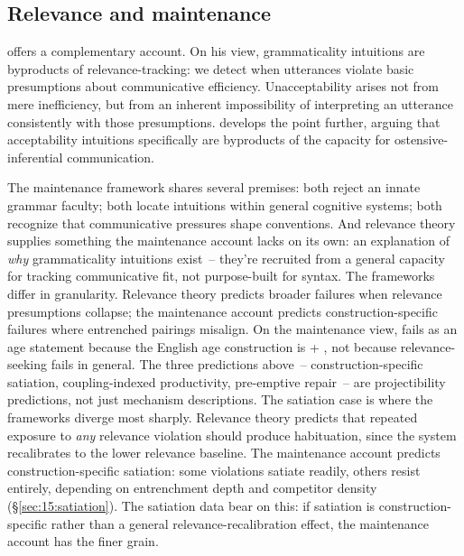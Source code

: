 \subsection{Relevance and maintenance}
\label{sec:15:relevance}

\textcite{scottphillips2024communication} offers a complementary account. On his view, grammaticality intuitions are byproducts of relevance-tracking: we detect when utterances violate basic presumptions about communicative efficiency. Unacceptability arises not from mere inefficiency, but from an inherent impossibility of interpreting an utterance consistently with those presumptions. \textcite{scottphillips2025intuitions} develops the point further, arguing that acceptability intuitions specifically are byproducts of the capacity for ostensive-inferential communication.

The maintenance framework shares several premises: both reject an innate grammar faculty; both locate intuitions within general cognitive systems; both recognize that communicative pressures shape conventions. And relevance theory supplies something the maintenance account lacks on its own: an explanation of \emph{why} grammaticality intuitions exist~-- they're recruited from a general capacity for tracking communicative fit, not purpose-built for syntax. The frameworks differ in granularity. Relevance theory predicts broader failures when relevance presumptions collapse; the maintenance account predicts construction-specific failures where entrenched pairings misalign. On the maintenance view, \ungram{} fails as an age statement because the English age construction is  + , not because relevance-seeking fails in general. The three predictions above~-- construction-specific satiation, coupling-indexed productivity, pre-emptive repair~-- are projectibility predictions, not just mechanism descriptions. The satiation case is where the frameworks diverge most sharply. Relevance theory predicts that repeated exposure to \emph{any} relevance violation should produce habituation, since the system recalibrates to the lower relevance baseline. The maintenance account predicts construction-specific satiation: some violations satiate readily, others resist entirely, depending on entrenchment depth and competitor density (§\ref{sec:15:satiation}). The satiation data bear on this: if satiation is construction-specific rather than a general relevance-recalibration effect, the maintenance account has the finer grain.


